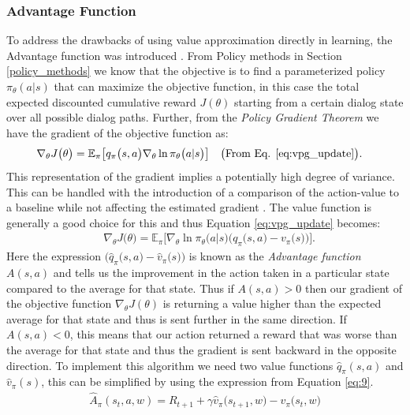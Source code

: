\documentclass[14pt]{extarticle}
\numberwithin{equation}{section}
\begin{document}
	\subsubsection{Advantage Function}
	To address the drawbacks of using value approximation directly in learning, the Advantage function was introduced \cite{Sutton_pg}. From Policy methods in Section \ref{policy_methods} we know that the objective is to find a parameterized policy $\pi_{\theta}(a|s)$ that can maximize the objective function, in this case the total expected discounted cumulative reward $J(\theta)$ starting from a certain dialog state over all possible dialog paths. Further, from the \textit{Policy Gradient Theorem}\cite{Sutton-introRL} we have the gradient of the objective function as:
	\begin{align}
	& \nabla_{\theta}J\big(\theta\big) = \mathbb{E}_{\pi}\big[q_{\pi}\big(s,a\big)\nabla_{\theta}\ln\pi_{\theta}\big(a|s\big)\big]\nonumber &&\big(\text{From Eq. \ref{eq:vpg_update}}\big) .
	\end{align}
	This representation of the gradient implies a potentially high degree of variance. This can be handled with the introduction of a comparison of the action-value to a baseline while not affecting the estimated gradient \cite{Sutton-introRL}. The value function is generally a good choice for this and thus Equation \ref{eq:vpg_update} becomes: 
	\begin{align}
	& \nabla_{\theta}J\big(\theta\big) = \mathbb{E}_{\pi}\big[\nabla_{\theta}\ln\pi_{\theta}\big(a|s\big)\big(q_{\pi}\big(s,a\big) - v_{\pi}\big(s\big) \big)\big].\label{eq:baseline}
	\end{align}
	Here the expression $\big(\hat{q}_{\pi}\big(s,a\big) - \hat{v}_{\pi}\big(s\big) \big)$ is known as the \textit{Advantage function} $A(s,a)$ and tells us the improvement in the action taken in a particular state compared to the average for that state. Thus if $A(s,a) > 0$ then our gradient of the objective function $\nabla_{\theta}J(\theta)$ is returning a value higher than the expected average for that state and thus is sent further in the same direction. If $A(s,a) < 0$, this means that our action returned a reward that was worse than the average for that state and thus the gradient is sent backward in the opposite direction. To implement this algorithm we need two value functions $\hat{q}_{\pi}(s,a)$ and $\hat{v}_{\pi}(s)$, this can be simplified by using the expression from Equation \ref{eq:9}.
	\begin{align}
	\hat{A}_{\pi}(s_t,a,w)  = R_{t+1} + \gamma \hat{v}_{\pi}\big(s_{t+1},w\big) - \hat{v}_{\pi}\big(s_t,w\big) \label{eq:adv}
	\end{align}
\end{document}
